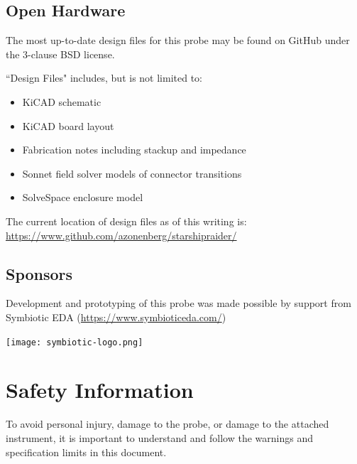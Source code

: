 \documentclass[11pt]{article}
\begin{document}
\subsection{Open Hardware}

The most up-to-date design files for this probe may be found on GitHub under the 3-clause BSD license.

``Design Files" includes, but is not limited to:
\begin{itemize}
\item KiCAD schematic
\item KiCAD board layout
\item Fabrication notes including stackup and impedance
\item Sonnet field solver models of connector transitions
\item SolveSpace enclosure model
\end{itemize}

The current location of design files as of this writing is: \url{https://www.github.com/azonenberg/starshipraider/}

\subsection{Sponsors}

Development and prototyping of this probe was made possible by support from Symbiotic EDA
(\url{https://www.symbioticeda.com/})

\texttt{[image: symbiotic-logo.png]}

\pagebreak
\section{Safety Information}

To avoid personal injury, damage to the probe, or damage to the attached instrument, it is important to understand and
follow the warnings and specification limits in this document.
\end{document}
